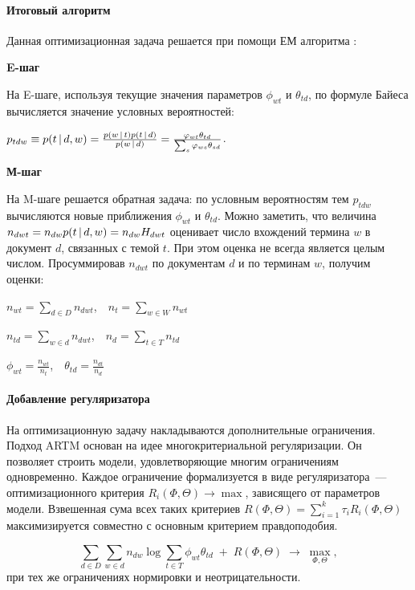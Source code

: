\documentclass[12pt, twoside]{article}
\begin{document}
\paragraph{Итоговый алгоритм}

Данная оптимизационная задача решается при помощи ЕМ алгоритма \cite{hofmann1999probabilistic}:

\noindent\textbf{E-шаг}

На E-шаге, используя текущие значения параметров $\phi_{wt}$ и $\theta_{td}$, по формуле Байеса вычисляется значение условных вероятностей:

$p_{tdw} \equiv p(t \mspace{3mu}{|}\mspace{3mu} d,w) = \frac {p(w \mspace{3mu}{|}\mspace{3mu} t)p(t \mspace{3mu}{|}\mspace{3mu} d)} {p(w \mspace{3mu}{|}\mspace{3mu} d)} = \frac {\varphi_{wt}\theta_{td}} {\sum_s\varphi_{ws}\theta_{sd}}$.

\noindent\textbf{М-шаг}

На M-шаге решается обратная задача: по условным вероятностям тем $p_{tdw}$ вычисляются новые приближения $\phi_{wt}$ и $\theta_{td}$.
Можно заметить, что величина $n_{dwt}=n_{dw}p(t \mspace{3mu}{|}\mspace{3mu} d,w)=n_{dw}H_{dwt}$ оценивает число вхождений термина $w$ в документ $d$, связанных с темой $t$. При этом оценка не всегда является целым числом. Просуммировав $n_{dwt}$ по документам $d$ и по терминам $w$, получим оценки:

$n_{wt}=\sum_{d \in D} n_{dwt}$,~~$n_t = \sum_{w \in W}n_{wt}$

$n_{td}=\sum_{w \in d} n_{dwt}$,~~$n_d = \sum_{t \in T}n_{td}$

$\phi_{wt}=\frac{n_{wt}}{n_t}$,~~$\theta_{td} = \frac{n_{dt}}{n_{d}}$


\paragraph{Добавление регуляризатора}

На оптимизационную задачу накладываются дополнительные ограничения. Подход ARTM \cite{vorontsov2014additive,vorontsov2014tutorial,vorontsov2015additive} основан на идее многокритериальной регуляризации. Он позволяет строить модели, удовлетворяющие многим ограничениям одновременно. Каждое ограничение формализуется в виде регуляризатора~--- оптимизационного критерия $R_i(\Phi,\Theta)\to\max$, зависящего от параметров модели. Взвешенная сума всех таких критериев $R(\Phi,\Theta) = \sum_{i=1}^k \tau_i R_i(\Phi,\Theta)$ максимизируется совместно с основным критерием правдоподобия.

\[
\sum_{d\in D} \sum_{w\in d} n_{dw}\log \sum_{t\in T} \phi_{wt}\theta_{td} \;+\; R(\Phi,\Theta)\;\to\; \max_{\Phi,\Theta},
\]
при тех же ограничениях нормировки и неотрицательности.
\end{document}
